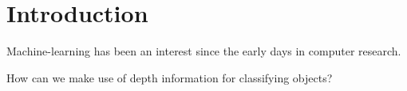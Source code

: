 \documentclass[dissertation.tex]{subfiles}
\begin{document}
\chapter{Introduction}
Machine-learning has been an interest since the early days in computer research. 

How can we make use of depth information for classifying objects?
\end{document}
